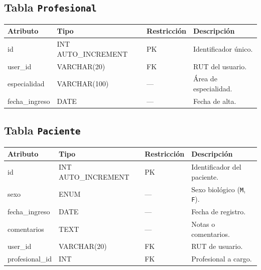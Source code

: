 \subsection*{Tabla \texttt{Profesional}}
{\footnotesize
\begin{tabularx}{\textwidth}{l l l X}
\hline
\textbf{Atributo} & \textbf{Tipo}       & \textbf{Restricción} & \textbf{Descripción} \\\hline
id                & INT AUTO\_INCREMENT & PK                   & Identificador único. \\
user\_id          & VARCHAR(20)         & FK                   & RUT del usuario. \\
especialidad      & VARCHAR(100)        & —                    & Área de especialidad. \\
fecha\_ingreso    & DATE                & —                    & Fecha de alta. \\\hline
\end{tabularx}
}

\subsection*{Tabla \texttt{Paciente}}
{\footnotesize
\begin{tabularx}{\textwidth}{l l l X}
\hline
\textbf{Atributo} & \textbf{Tipo}              & \textbf{Restricción}  & \textbf{Descripción} \\\hline
id               & INT AUTO\_INCREMENT        & PK                    & Identificador del paciente. \\
sexo             & ENUM                       & —                     & Sexo biológico (\texttt{M}, \texttt{F}). \\
fecha\_ingreso   & DATE                       & —                     & Fecha de registro. \\
comentarios      & TEXT                       & —                     & Notas o comentarios. \\
user\_id         & VARCHAR(20)                & FK                    & RUT de usuario. \\
profesional\_id  & INT                        & FK                    & Profesional a cargo. \\\hline
\end{tabularx}
}

